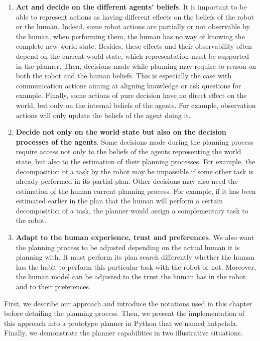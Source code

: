 \documentclass[a4paper,11pt,twoside]{StyleThese}
\begin{document}
\begin{enumerate}
\item \textbf{Act and decide on the different agents' beliefs}. It is important to be able to represent actions as having different effects on the beliefs of the robot or the human. Indeed, some robot actions are partially or not observable by the human, when performing them, the human has no way of knowing the complete new world state. Besides, these effects and their observability often depend on the current world state, which representation must be supported in the planner. Then, decisions made while planning may require to reason on both the robot and the human beliefs. This is especially the case with communication actions aiming at aligning knowledge or ask questions for example. Finally, some actions of pure decision have no direct effect on the world, but only on the internal beliefs of the agents. For example, observation actions will only update the beliefs of the agent doing it.

\item \textbf{Decide not only on the world state but also on the decision processes of the agents}. Some decisions made during the planning process require access not only to the beliefs of the agents representing the world state, but also to the estimation of their planning processes. For example, the decomposition of a task by the robot may be impossible if some other task is already performed in its partial plan. Other decisions may also need the estimation of the human current planning process. For example, if it has been estimated earlier in the plan that the human will perform a certain decomposition of a task, the planner would assign a complementary task to the robot.

\item \textbf{Adapt to the human experience, trust and preferences}. We also want the planning process to be adjusted depending on the actual human it is planning with. It must perform its plan search differently whether the human has the habit to perform this particular task with the robot or not. Moreover, the human model can be adjusted to the trust the human has in the robot and to their preferences. 
\end{enumerate}

First, we describe our approach and introduce the notations used in this chapter before detailing the planning process. Then, we present the implementation of this approach into a prototype planner in Python that we named \acrfull{hatpehda}. Finally, we demonstrate the planner capabilities in two illustrative situations.
\end{document}

